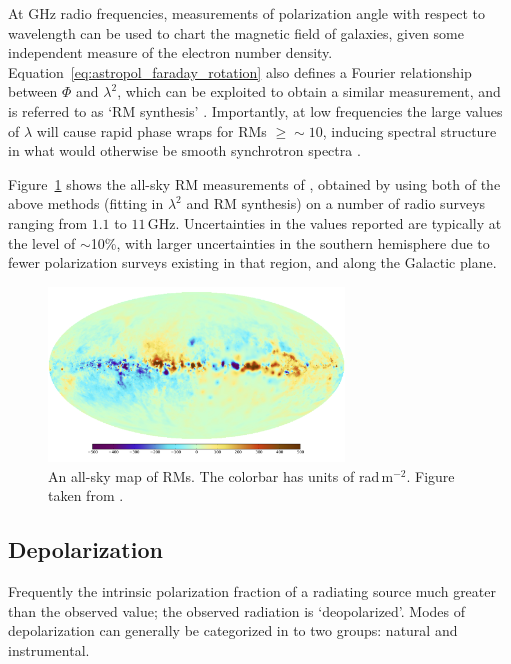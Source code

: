 At GHz radio frequencies, measurements of polarization angle with respect to wavelength can be used to chart the magnetic field of galaxies, given some independent measure of the electron number density. Equation~\ref{eq:astropol_faraday_rotation} also defines a Fourier relationship between $\Phi$ and $\lambda^2$, which can be exploited to obtain a similar measurement, and is referred to as `RM synthesis' \citep{Brentjens.05}. Importantly, at low frequencies the large values of $\lambda$ will cause rapid phase wraps for RMs $\geq \sim 10$, inducing spectral structure in what would otherwise be smooth synchrotron spectra \citep{Moore.13}. 

Figure~\ref{fig:astropol_rm_map} shows the all-sky RM measurements of \cite{Oppermann.12}, obtained by using both of the above methods (fitting in $\lambda^2$ and RM synthesis) on a number of radio surveys ranging from $1.1$ to $11$\,GHz. Uncertainties in the values reported are typically at the level of $\sim$10\%, with larger uncertainties in the southern hemisphere due to fewer polarization surveys existing in that region, and along the Galactic plane. 

\begin{figure}
\centering
\includegraphics[width=0.7\textwidth]{chapters/astropol/figures/oppermann_map.png}
\caption[An all-sky map of RMs.]{An all-sky map of RMs. The colorbar has units of rad\,m$^{-2}$. Figure taken from \cite{Oppermann.12}.}
\label{fig:astropol_rm_map}
\end{figure}

\subsection{Depolarization}
\label{subsec:astropol_depolar}

Frequently the intrinsic polarization fraction of a radiating source much greater than the observed value; the observed radiation is `deopolarized'. Modes of depolarization can generally be categorized in to two groups: natural and instrumental. 

